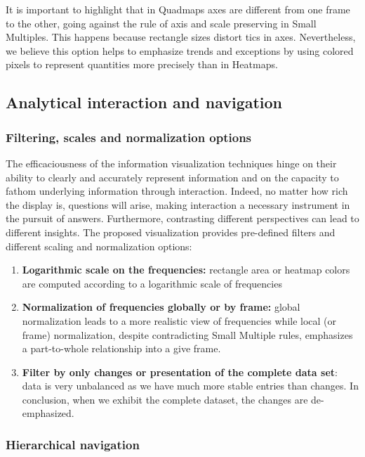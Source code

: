 It is important to highlight that in Quadmaps axes are different from one frame to the other, going against the rule of axis and scale preserving in Small Multiples. This happens because rectangle sizes distort tics in axes. Nevertheless, we believe this option helps to emphasize trends and exceptions by using colored pixels to represent quantities more precisely than in Heatmaps.

\subsection{Analytical interaction and navigation}

\subsubsection{Filtering, scales and normalization options}

The efficaciousness of the information visualization techniques hinge on their ability to clearly and accurately represent information and on the capacity to fathom underlying information through interaction. Indeed, no matter how rich the display is, questions will arise, making interaction a necessary instrument in the pursuit of answers. Furthermore, contrasting different perspectives can lead to different insights. The proposed visualization provides pre-defined filters and different scaling and normalization options: 

\begin{enumerate}
\item \textbf{Logarithmic scale on the frequencies:} rectangle area or heatmap colors are computed according to a logarithmic scale of frequencies
\item \textbf{Normalization of frequencies globally or by frame:} global normalization leads to a more realistic view of frequencies while local (or frame) normalization, despite contradicting Small Multiple rules, emphasizes a part-to-whole relationship into a give frame.
\item \textbf{Filter by only changes or presentation of the complete data set}: data is very unbalanced as we have much more stable entries than changes. In conclusion, when we exhibit the complete dataset, the changes are de-emphasized. 
\end{enumerate}

\subsubsection{Hierarchical navigation}

